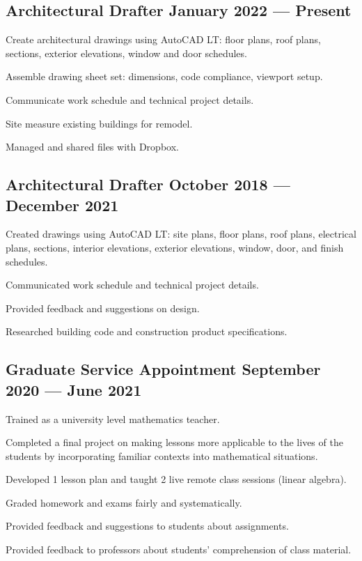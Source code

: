 \documentclass[letter,10pt]{article}
\begin{document}
\subsection{{Architectural Drafter \hfill January 2022 --- Present}}
\begin{zitemize}
    \item Create architectural drawings using AutoCAD LT: floor plans, roof plans, sections, exterior elevations, window and door schedules.
    \item Assemble drawing sheet set: dimensions, code compliance, viewport setup.
    \item Communicate work schedule and technical project details.
    \item Site measure existing buildings for remodel.
    \item Managed and shared files with Dropbox.
\end{zitemize}

\subsection{{Architectural Drafter \hfill October 2018 --- December 2021}}
\begin{zitemize}
    \item Created drawings using AutoCAD LT: site plans, floor plans, roof plans, electrical plans, sections, interior elevations, exterior elevations, window, door, and finish schedules.
    \item Communicated work schedule and technical project details.
    \item Provided feedback and suggestions on design.
    \item Researched building code and construction product specifications.
\end{zitemize}

\newpage
\subsection{{Graduate Service Appointment \hfill September 2020 --- June 2021}}
\begin{zitemize}
    \item Trained as a university level mathematics teacher.
    \item Completed a final project on making lessons more applicable to the lives of the students by incorporating familiar contexts into mathematical situations.
    \item Developed 1 lesson plan and taught 2 live remote class sessions (linear algebra).
    \item Graded homework and exams fairly and systematically.
    \item Provided feedback and suggestions to students about assignments.
    \item Provided feedback to professors about students' comprehension of class material.
\end{zitemize}
\end{document}
